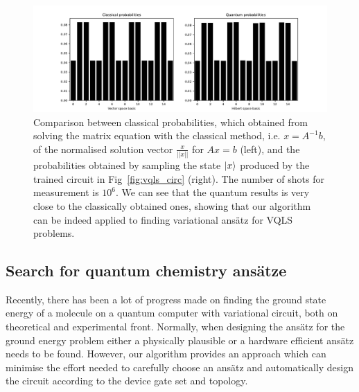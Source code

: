 \documentclass{ieeeaccess}
\begin{document}
  \begin{figure}[t!]
    \centering
    \includegraphics[width=\linewidth]{peiyong_fig_8.pdf}
    \caption{Comparison between classical probabilities, which obtained from solving the matrix equation with the classical method, i.e. $x = A^{-1}b$, of the normalised solution vector $\frac{x}{||x||}$ for $Ax = b$ (left), and the probabilities obtained by sampling the state $\ket{x}$ produced by the trained circuit in Fig~\ref{fig:vqls_circ} (right). The number of shots for measurement is $10^6$. We can see that the quantum results is very close to the classically obtained ones, showing that our algorithm can be indeed applied to finding variational ans\"atz for VQLS problems.}
    \label{fig:vqls_results_compare}
  \end{figure}

  \subsection{Search for quantum chemistry ans\"atze}\label{h2}


  Recently, there has been a lot of progress made on finding the ground state energy of a molecule on a quantum computer with variational circuit, both on theoretical \cite{li2017efficient,mcclean2016theory,wecker2015progress} and experimental \cite{peruzzo2014variational,o2016scalable, colless2017implementing, kandala2017hardware, colless2018computation, dumitrescu2018cloud} front. 
  Normally, when designing the ans\"atz for the ground energy problem either a physically plausible or a hardware efficient ans\"atz needs to be found. However, our algorithm provides an approach which can minimise the effort needed to carefully choose an ans\"atz and automatically design the circuit according to the device gate set and topology.
  
\end{document}
